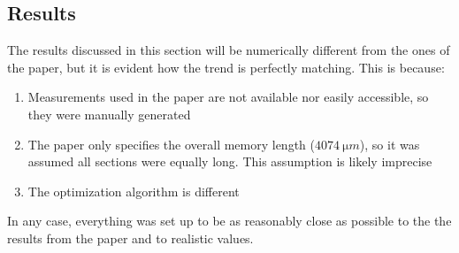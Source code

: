 \subsection{Results}
The results discussed in this section will be numerically different from the ones of the paper, but it is evident how the trend is perfectly matching. This is because:
\begin{enumerate}
    \item Measurements used in the paper are not available nor easily accessible, so they were manually generated
    \item The paper only specifies the overall memory length ($\SI{4074}{\micro m}$), so it was assumed all sections were equally long. This assumption is likely imprecise
    \item The optimization algorithm is different
\end{enumerate}
In any case, everything was set up to be as reasonably close as possible to the the results from the paper and to realistic values.


